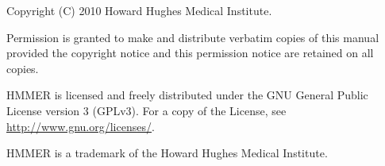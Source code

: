 \vspace*{\fill}
\begin{flushleft}
Copyright (C) 2010 Howard Hughes Medical Institute.\vspace{5mm}

\vspace{5mm}
Permission is granted to make and distribute verbatim copies of this
manual provided the copyright notice and this permission notice are
retained on all copies.\vspace{5mm}

\vspace{5mm} HMMER is licensed and freely distributed under the GNU
General Public License version 3 (GPLv3). For a copy of the License,
see \url{http://www.gnu.org/licenses/}.

\vspace{5mm}
HMMER is a trademark of the Howard Hughes Medical Institute.

\vspace{5mm}
\end{flushleft}



